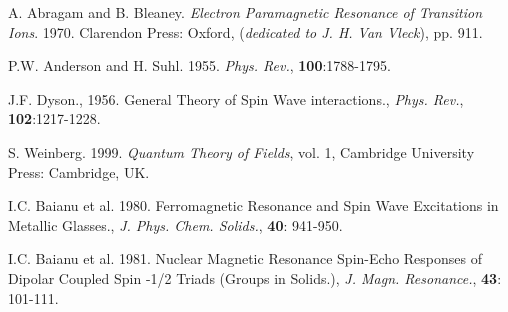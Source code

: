 \documentclass[12pt]{article}
\theoremstyle{plain}
\theoremstyle{definition}
\numberwithin{equation}{section}
\begin{document}
\begin{thebibliography}{9}

A. Abragam and B. Bleaney. {\em Electron Paramagnetic Resonance of Transition Ions}. 1970.
Clarendon Press: Oxford, ({\em dedicated to J. H. Van Vleck}), pp. 911. 

P.W. Anderson and H. Suhl. 1955. {\em Phys. Rev.},  {\bf 100}:1788-1795.

J.F. Dyson., 1956. General Theory of Spin Wave interactions., {\em Phys. Rev.}, {\bf 102}:1217-1228. 

S. Weinberg. 1999. \emph{Quantum Theory of Fields}, vol. 1, Cambridge University Press: Cambridge, UK.

I.C. Baianu et al. 1980. Ferromagnetic Resonance and Spin Wave Excitations in Metallic Glasses., 
{\em J. Phys. Chem. Solids.}, {\bf 40}: 941-950.

I.C. Baianu et al. 1981. Nuclear Magnetic Resonance Spin-Echo Responses of Dipolar Coupled Spin -1/2 Triads 
(Groups in Solids.), {\em J. Magn. Resonance.}, {\bf 43}: 101-111.

\end{thebibliography}

\end{document}
